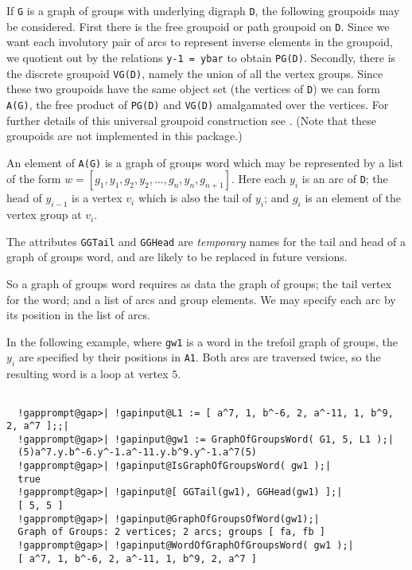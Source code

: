 \documentclass[a4paper,11pt]{report}
\begin{document}
{{{ If \texttt{G} is a graph of groups with underlying digraph \texttt{D}, the following groupoids may be considered. First there is the free groupoid
or path groupoid on \texttt{D}. Since we want each involutory pair of arcs to represent inverse elements in
the groupoid, we quotient out by the relations \texttt{y\texttt{}-1 = ybar} to obtain \texttt{PG(D)}. Secondly, there is the discrete groupoid \texttt{VG(D)}, namely the union of all the vertex groups. Since these two groupoids have
the same object set (the vertices of \texttt{D}) we can form \texttt{A(G)}, the free product of \texttt{PG(D)} and \texttt{VG(D)} amalgamated over the vertices. For further details of this universal groupoid
construction see \cite{emma-thesis}. (Note that these groupoids are not implemented in this package.) 

 An element of \texttt{A(G)} is a graph of groups word which may be represented by a list of the form $w = [g_1,y_1,g_2,y_2,...,g_n,y_n,g_{n+1}]$. Here each $y_i$ is an arc of \texttt{D}; the head of $y_{i-1}$ is a vertex $v_i$ which is also the tail of $y_i$; and $g_i$ is an element of the vertex group at $v_i$. 

 The attributes \texttt{GGTail} and \texttt{GGHead} are \emph{temporary} names for the tail and head of a graph of groups word, and are likely to be
replaced in future versions. 

 So a graph of groups word requires as data the graph of groups; the tail
vertex for the word; and a list of arcs and group elements. We may specify
each arc by its position in the list of arcs. 

 In the following example, where \texttt{gw1} is a word in the trefoil graph of groups, the $y_i$ are specified by their positions in \texttt{A1}. Both arcs are traversed twice, so the resulting word is a loop at vertex $5$. 

 }

 
\begin{Verbatim}[commandchars=!@|,fontsize=\small,frame=single,label=Example]
  
  !gapprompt@gap>| !gapinput@L1 := [ a^7, 1, b^-6, 2, a^-11, 1, b^9, 2, a^7 ];;|
  !gapprompt@gap>| !gapinput@gw1 := GraphOfGroupsWord( G1, 5, L1 );|
  (5)a^7.y.b^-6.y^-1.a^-11.y.b^9.y^-1.a^7(5)
  !gapprompt@gap>| !gapinput@IsGraphOfGroupsWord( gw1 );|
  true
  !gapprompt@gap>| !gapinput@[ GGTail(gw1), GGHead(gw1) ];|
  [ 5, 5 ]
  !gapprompt@gap>| !gapinput@GraphOfGroupsOfWord(gw1);|
  Graph of Groups: 2 vertices; 2 arcs; groups [ fa, fb ]
  !gapprompt@gap>| !gapinput@WordOfGraphOfGroupsWord( gw1 );|
  [ a^7, 1, b^-6, 2, a^-11, 1, b^9, 2, a^7 ]
  

\end{Verbatim}}}
\end{document}
